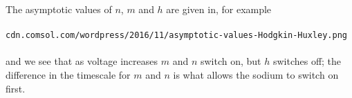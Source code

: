 \documentclass[a4paper,12pt]{article}
\begin{document}
\begin{enumerate}
The asymptotic values of $n$, $m$ and $h$ are given in, for example\\
\\
\texttt{cdn.comsol.com/wordpress/2016/11/asymptotic-values-Hodgkin-Huxley.png}\\
\\
and we see that as voltage increases $m$ and $n$ switch on, but $h$ switches off; the difference in the timescale for $m$ and $n$ is what allows the sodium to switch on first.
 \fi

\end{enumerate}
\end{document}
